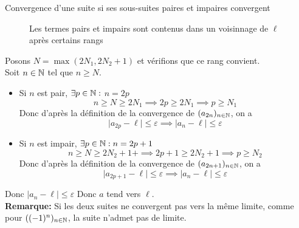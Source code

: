 \documentclass{article}
\begin{document}
\begin{question_kholle}{Convergence d'une suite si ses sous-suites paires et impaires convergent}
\begin{figure}[H]
		\caption{Les termes pairs et impairs sont contenus dans un voisinnage de $\ell$ après certains rangs}
	\end{figure}

	\noindent Posons $N = \max(2N_{1}, 2N_{2}+1)$ et vérifions que ce rang convient. \\
	Soit $n \in \mathbb N$ tel que $n \geqslant N$.
	\begin{itemize}[label=$\star$]
		\item Si $n$ est pair, $\exists p \in \mathbb N :$ $n = 2p$
		      $$
			      n\geqslant N \geqslant 2N_{1} \implies 2p \geqslant 2N_{1} \implies p \geqslant N_{1}
		      $$
		      Donc d'après la définition de la convergence de $(a_{2n})_{n \in \mathbb N}$, on a
		      $$
			      \lvert a_{2p} - \ell \rvert  \leqslant \varepsilon \implies \lvert a_{n} - \ell  \rvert  \leqslant \varepsilon
		      $$

		\item Si $n$ est impair, $\exists p \in \mathbb N : n = 2p +1$
		      $$
			      n \geqslant N \geqslant 2N_{2}+1 +\implies 2p+1 \geqslant 2N_{2} + 1 \implies p \geqslant N_{2}
		      $$
		      Donc d'après la définition de la convergence de $(a_{2n+1})_{n \in \mathbb N}$, on a
		      $$
			      \lvert a_{2p+1} - \ell\rvert  \leqslant \varepsilon \implies \lvert a_{n} - \ell \rvert \leqslant \varepsilon
		      $$
	\end{itemize}
	Donc $\lvert a_{n} - \ell  \rvert\leqslant \varepsilon$
	Donc $a$ tend vers $\ell$.\\[4pt]
	\textbf{Remarque:} Si les deux suites ne convergent pas vers la même limite, comme pour $((-1)^{n})_{n \in \mathbb N}$, la suite n'admet pas de limite.
\end{question_kholle}
\end{document}
